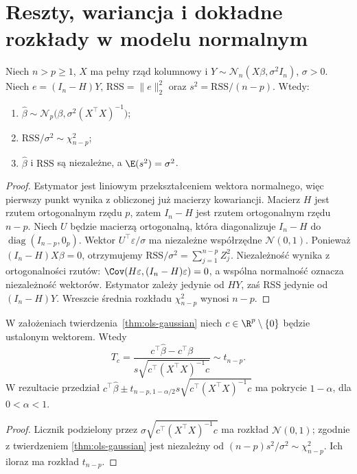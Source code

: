 \section{Reszty, wariancja i dokładne rozkłady w modelu normalnym}
\begin{twierdzenie}
\label{thm:ols-gaussian}
Niech $n>p\ge1$, $X$ ma pełny rząd kolumnowy i
$Y\sim\mathcal N_n(X\beta,\sigma^2I_n)$, $\sigma>0$.
Niech $e=(I_n-H)Y$, $\mathrm{RSS}=\|e\|_2^2$ oraz
$s^2=\mathrm{RSS}/(n-p)$. Wtedy:
\begin{enumerate}
\item $\widehat\beta\sim\mathcal N_p\!\bigl(\beta,
 \sigma^2(X^\top X)^{-1}\bigr)$;
\item $\mathrm{RSS}/\sigma^2\sim\chi^2_{n-p}$;
\item $\widehat\beta$ i $\mathrm{RSS}$ są niezależne,
 a $\E(s^2)=\sigma^2$.
\end{enumerate}
\end{twierdzenie}
\begin{proof}
Estymator jest liniowym przekształceniem wektora normalnego,
więc pierwszy punkt wynika z obliczonej już macierzy kowariancji.
Macierz $H$ jest rzutem ortogonalnym rzędu $p$, zatem
$I_n-H$ jest rzutem ortogonalnym rzędu $n-p$.
Niech $U$ będzie macierzą ortogonalną, która diagonalizuje
$I_n-H$ do $\operatorname{diag}(I_{n-p},0_p)$.
Wektor $U^\top\varepsilon/\sigma$ ma niezależne
współrzędne $\mathcal N(0,1)$. Ponieważ
$(I_n-H)X\beta=0$, otrzymujemy
$\mathrm{RSS}/\sigma^2=\sum_{j=1}^{n-p}Z_j^2$.
Niezależność wynika z ortogonalności rzutów:
$\Cov(H\varepsilon,(I_n-H)\varepsilon)=0$,
a wspólna normalność oznacza niezależność wektorów.
Estymator zależy jedynie od $HY$, zaś RSS jedynie od
$(I_n-H)Y$. Wreszcie średnia rozkładu
$\chi^2_{n-p}$ wynosi $n-p$.
\end{proof}

\begin{wniosek}
\label{cor:ols-ci}
W założeniach twierdzenia~\ref{thm:ols-gaussian}
niech $c\in\R^p\setminus\{0\}$ będzie ustalonym
wektorem. Wtedy
\[
 T_c=\frac{c^\top\widehat\beta-c^\top\beta}
 {s\sqrt{c^\top(X^\top X)^{-1}c}}\sim t_{n-p}.
\]
W rezultacie przedział
$c^\top\widehat\beta\pm t_{n-p,1-\alpha/2}
 s\sqrt{c^\top(X^\top X)^{-1}c}$
ma pokrycie $1-\alpha$, dla $0<\alpha<1$.
\end{wniosek}
\begin{proof}
Licznik podzielony przez
$\sigma\sqrt{c^\top(X^\top X)^{-1}c}$ ma rozkład
$\mathcal N(0,1)$; zgodnie z twierdzeniem
\ref{thm:ols-gaussian} jest niezależny od
$(n-p)s^2/\sigma^2\sim\chi^2_{n-p}$.
Ich iloraz ma rozkład $t_{n-p}$.
\end{proof}

